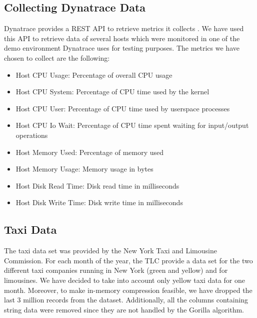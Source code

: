 \subsection{Collecting Dynatrace Data}
Dynatrace provides a REST API to retrieve metrics it collects \cite{a2013_metrics}.
We have used this API to retrieve data of several hosts which were monitored in one of the demo environment
Dynatrace uses for testing purposes.
The metrics we have chosen to collect are the following:
\begin{itemize}
    \item Host CPU Usage: Percentage of overall CPU usage
    \item Host CPU System: Percentage of CPU time used by the kernel
    \item Host CPU User: Percentage of CPU time used by userspace processes
    \item Host CPU Io Wait: Percentage of CPU time spent waiting for input/output operations
    \item Host Memory Used: Percentage of memory used
    \item Host Memory Usage: Memory usage in bytes
    \item Host Disk Read Time: Disk read time in milliseconds
    \item Host Disk Write Time: Disk write time in milliseconds
\end{itemize}

\subsection{Taxi Data}
The taxi data set was provided by the New York Taxi and Limousine Commission. For each month of the year,
the TLC provide a data set for the two different taxi companies running in New York (green and yellow)
and for limousines. We have decided to take into account only yellow taxi data for one month.
Moreover, to make in-memory compression feasible, we have dropped the last 3 million records from the
dataset. Additionally, all the columns containing string data were removed since they are not handled
by the Gorilla algorithm.

